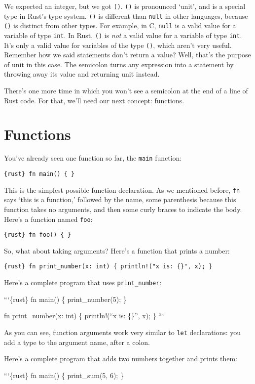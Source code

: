 \documentclass[]{article}
\begin{document}
We expected an integer, but we got \texttt{()}. \texttt{()} is
pronounced `unit', and is a special type in Rust's type system.
\texttt{()} is different than \texttt{null} in other languages, because
\texttt{()} is distinct from other types. For example, in C,
\texttt{null} is a valid value for a variable of type \texttt{int}. In
Rust, \texttt{()} is \emph{not} a valid value for a variable of type
\texttt{int}. It's only a valid value for variables of the type
\texttt{()}, which aren't very useful. Remember how we said statements
don't return a value? Well, that's the purpose of unit in this case. The
semicolon turns any expression into a statement by throwing away its
value and returning unit instead.

There's one more time in which you won't see a semicolon at the end of a
line of Rust code. For that, we'll need our next concept: functions.

\section{Functions}\label{functions}

You've already seen one function so far, the \texttt{main} function:

\texttt{\{rust\} fn main() \{ \}}

This is the simplest possible function declaration. As we mentioned
before, \texttt{fn} says `this is a function,' followed by the name,
some parenthesis because this function takes no arguments, and then some
curly braces to indicate the body. Here's a function named \texttt{foo}:

\texttt{\{rust\} fn foo() \{ \}}

So, what about taking arguments? Here's a function that prints a number:

\texttt{\{rust\} fn print\_number(x: int) \{     println!("x is: \{\}", x); \}}

Here's a complete program that uses \texttt{print\_number}:

```\{rust\} fn main() \{ print\_number(5); \}

fn print\_number(x: int) \{ println!(``x is: \{\}'', x); \} ```

As you can see, function arguments work very similar to \texttt{let}
declarations: you add a type to the argument name, after a colon.

Here's a complete program that adds two numbers together and prints
them:

```\{rust\} fn main() \{ print\_sum(5, 6); \}
\end{document}
